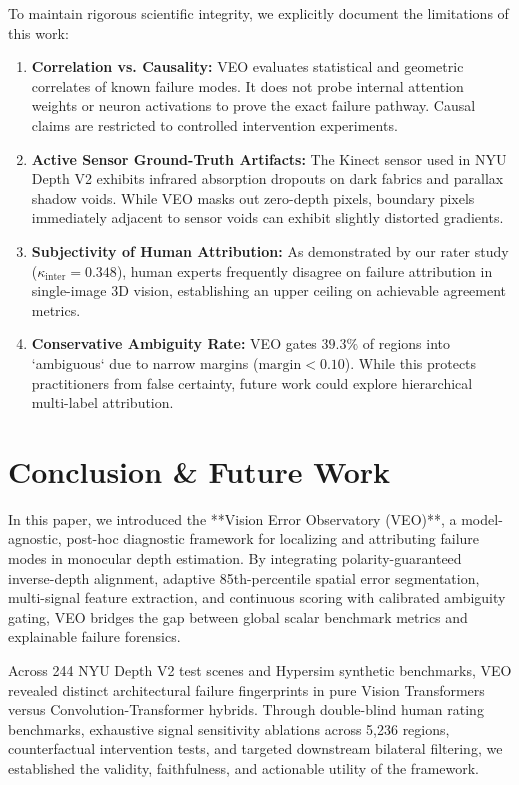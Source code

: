 \documentclass[11pt,a4paper]{article}
\begin{document}
To maintain rigorous scientific integrity, we explicitly document the limitations of this work:
\begin{enumerate}
    \item \textbf{Correlation vs. Causality:} VEO evaluates statistical and geometric correlates of known failure modes. It does not probe internal attention weights or neuron activations to prove the exact failure pathway. Causal claims are restricted to controlled intervention experiments.
    \item \textbf{Active Sensor Ground-Truth Artifacts:} The Kinect sensor used in NYU Depth V2 exhibits infrared absorption dropouts on dark fabrics and parallax shadow voids. While VEO masks out zero-depth pixels, boundary pixels immediately adjacent to sensor voids can exhibit slightly distorted gradients.
    \item \textbf{Subjectivity of Human Attribution:} As demonstrated by our rater study ($\kappa_{\mathrm{inter}} = 0.348$), human experts frequently disagree on failure attribution in single-image 3D vision, establishing an upper ceiling on achievable agreement metrics.
    \item \textbf{Conservative Ambiguity Rate:} VEO gates $39.3\%$ of regions into `ambiguous` due to narrow margins ($\text{margin} < 0.10$). While this protects practitioners from false certainty, future work could explore hierarchical multi-label attribution.
\end{enumerate}

\section{Conclusion \& Future Work}
\label{sec:conclusion}

In this paper, we introduced the **Vision Error Observatory (VEO)**, a model-agnostic, post-hoc diagnostic framework for localizing and attributing failure modes in monocular depth estimation. By integrating polarity-guaranteed inverse-depth alignment, adaptive 85th-percentile spatial error segmentation, multi-signal feature extraction, and continuous scoring with calibrated ambiguity gating, VEO bridges the gap between global scalar benchmark metrics and explainable failure forensics.

Across 244 NYU Depth V2 test scenes and Hypersim synthetic benchmarks, VEO revealed distinct architectural failure fingerprints in pure Vision Transformers versus Convolution-Transformer hybrids. Through double-blind human rating benchmarks, exhaustive signal sensitivity ablations across 5,236 regions, counterfactual intervention tests, and targeted downstream bilateral filtering, we established the validity, faithfulness, and actionable utility of the framework.
\end{document}

